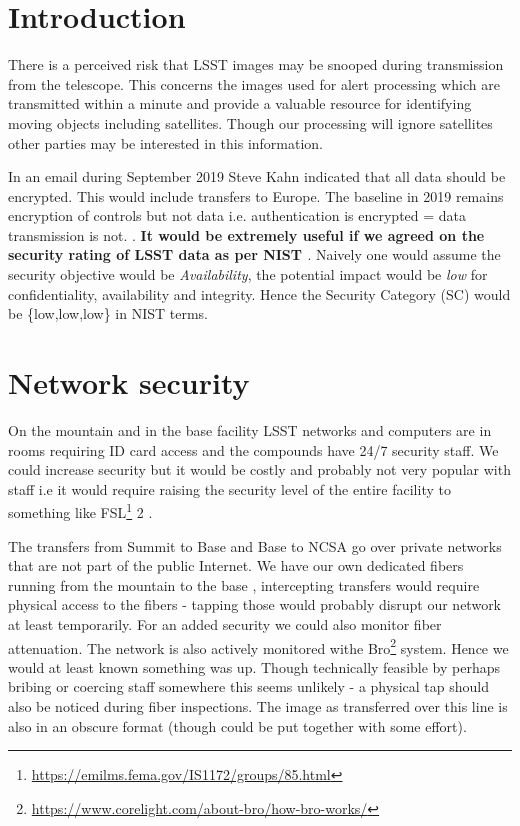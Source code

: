 \section{Introduction} \label{sec:intro}


There is a perceived  risk that LSST  images may be snooped during transmission from the telescope. This concerns the images used for alert processing which are transmitted within a minute and provide a valuable resource for identifying moving objects including satellites. Though our processing will ignore satellites other parties may be interested in this information.

In an email during September 2019 Steve Kahn indicated that all data should be encrypted. This would include transfers to Europe.
The baseline in 2019 remains encryption of controls but not data i.e. authentication is encrypted = data transmission is not.
.
{\bf It would be extremely useful if we agreed on the security rating of LSST data as per NIST  \citep{nist800-60}}.
Naively one would assume the security objective would be \emph{Availability}, the potential impact would be \emph{low} for confidentiality, availability and integrity. Hence  the Security Category (SC) would be \{low,low,low\} in NIST terms.

\section{Network security}\label{sec:net}

On the mountain and in the base facility LSST networks and computers are in rooms requiring ID card access and the compounds
have 24/7 security staff.
We could increase security but it would be costly and probably not very popular with staff i.e it would require raising the security level of the entire facility to something like FSL\footnote{\url{https://emilms.fema.gov/IS1172/groups/85.html}} 2 .

The transfers from Summit to Base and Base to NCSA go over private networks that are not part of the public Internet. We have our own dedicated fibers running from the mountain to the base ,
intercepting transfers would require physical access to the fibers - tapping those would probably disrupt our network at least temporarily.
For an added security we could also monitor fiber attenuation.
The network is also actively monitored withe Bro\footnote{\url{https://www.corelight.com/about-bro/how-bro-works/}} system. Hence we would at least known something was up.
Though technically feasible by perhaps bribing or coercing staff somewhere this seems unlikely - a physical tap should also be noticed during fiber inspections.  The image as transferred over this line is also in an obscure format (though could be put together with some effort).


